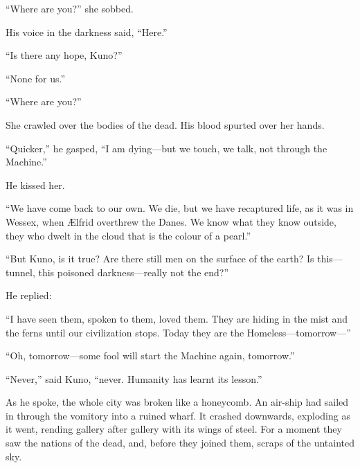 ``Where are you?'' she sobbed.

His voice in the darkness said, ``Here.''

``Is there any hope, Kuno?''

``None for us.''

``Where are you?''

She crawled over the bodies of the dead. His blood spurted over her hands.

``Quicker,'' he gasped, ``I am dying---but we touch, we talk, not through the Machine.''

He kissed her.

``We have come back to our own. We die, but we have recaptured life, as it was in Wessex, when \AE lfrid overthrew the Danes. We know what they know outside, they who dwelt in the cloud that is the colour of a pearl.''

``But Kuno, is it true? Are there still men on the surface of the earth? Is this---tunnel, this poisoned darkness---really not the end?''

He replied:

``I have seen them, spoken to them, loved them. They are hiding in the mist and the ferns until our civilization stops. Today they are the Homeless---tomorrow---'' %

``Oh, tomorrow---some fool will start the Machine again, tomorrow.''

``Never,'' said Kuno, ``never. Humanity has learnt its lesson.''

As he spoke, the whole city was broken like a honeycomb. An air-ship had sailed in through the vomitory into a ruined wharf. It crashed downwards, exploding as it went, rending gallery after gallery with its wings of steel. For a moment they saw the nations of the dead, and, before they joined them, scraps of the untainted sky.
